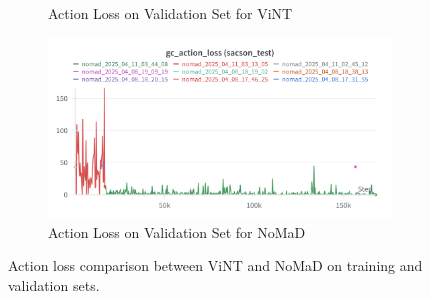 \documentclass[12pt]{article}
\begin{document}
\begin{figure}[H]
\begin{subfigure}[b]{0.48\textwidth}
        \caption{Action Loss on Validation Set for ViNT}
        \label{fig:gc_action_loss_val_vint}
    \end{subfigure}
    \hfill
    \begin{subfigure}[b]{0.48\textwidth}
        \centering
        \includegraphics[width=\textwidth]{images/gc_actionloss_test_nomad.png}
        \caption{Action Loss on Validation Set for NoMaD}
        \label{fig:gc_action_loss_val_vint}
    \end{subfigure}
    \caption{Action loss comparison between ViNT and NoMaD on training and validation sets.}
\end{figure}
\end{document}
